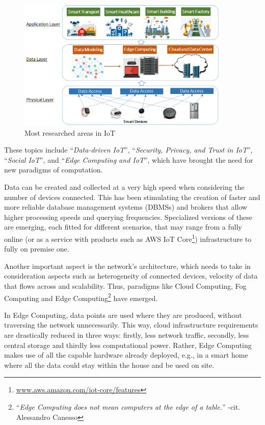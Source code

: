 			\begin{figure}[h]
				\centering
				\includegraphics[width=0.9\textwidth]{resources/img/chap2/iot_research_areas}
				\caption[Most researched areas in IoT]{Most researched areas in IoT \cite{9319033}}
				\label{iot_research_areas}
			\end{figure}
		
			These topics include ``\textit{Data-driven IoT}'', ``\textit{Security, Privacy, and Trust in IoT}'', ``\textit{Social IoT}'', and ``\textit{Edge Computing and IoT}'', which have brought the need for new paradigms of computation.
			
			Data can be created and collected at a very high speed when considering the number of devices connected.
			This has been stimulating the creation of faster and more reliable database management systems (DBMSs) and brokers that allow higher processing speeds and querying frequencies.
			Specialized versions of these are emerging, each fitted for different scenarios, that may range from a fully online (or as a service with products such as AWS IoT Core\footnote{ \url{www.aws.amazon.com/iot-core/features}}) infrastructure to fully on premise one.
			
			Another important aspect is the network's architecture, which needs to take in consideration aspects such as heterogeneity of connected devices, velocity of data that flows across and scalability.
			Thus, paradigms like Cloud Computing, Fog Computing and Edge Computing\footnote{ ``\textit{Edge Computing does not mean computers at the edge of a table.}'' -cit. Alessandro Canesso} have emerged.
			
			In Edge Computing, data points are used where they are produced, without traversing the network unnecessarily.
			This way, cloud infrastructure requirements are drastically reduced in three ways: ﬁrstly, less network traffic, secondly, less central storage and thirdly less computational power.
			Rather, Edge Computing makes use of all the capable hardware already deployed, e.g., in a smart home where all the data could stay within the house and be used on site.
			
